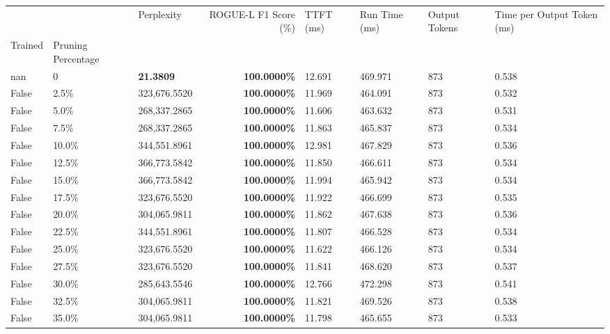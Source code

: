 \begin{table}[H]
{\label{tab:evaluation-pipeline-6-untrained}
\begin{tabular}{lllrllll}
\toprule
 &  & Perplexity & ROGUE-L F1 Score (\%) & TTFT (ms) & Run Time (ms) & Output Tokens & Time per Output Token (ms) \\
Trained & Pruning Percentage &  &  &  &  &  &  \\
\midrule
nan & 0 & \bfseries 21.3809 & \bfseries 100.0000\% & 12.691 & 469.971 & 873 & 0.538 \\
\cline{1-8}
False & 2.5\% & 323,676.5520 & \bfseries \color{red} 100.0000\% & 11.969 & 464.091 & 873 & 0.532 \\
\cline{1-8}
False & 5.0\% & \color{red} 268,337.2865 & \bfseries \color{red} 100.0000\% & 11.606 & 463.632 & 873 & 0.531 \\
\cline{1-8}
False & 7.5\% & \color{red} 268,337.2865 & \bfseries \color{red} 100.0000\% & 11.863 & 465.837 & 873 & 0.534 \\
\cline{1-8}
False & 10.0\% & 344,551.8961 & \bfseries \color{red} 100.0000\% & 12.981 & 467.829 & 873 & 0.536 \\
\cline{1-8}
False & 12.5\% & 366,773.5842 & \bfseries \color{red} 100.0000\% & 11.850 & 466.611 & 873 & 0.534 \\
\cline{1-8}
False & 15.0\% & 366,773.5842 & \bfseries \color{red} 100.0000\% & 11.994 & 465.942 & 873 & 0.534 \\
\cline{1-8}
False & 17.5\% & 323,676.5520 & \bfseries \color{red} 100.0000\% & 11.922 & 466.699 & 873 & 0.535 \\
\cline{1-8}
False & 20.0\% & 304,065.9811 & \bfseries \color{red} 100.0000\% & 11.862 & 467.638 & 873 & 0.536 \\
\cline{1-8}
False & 22.5\% & 344,551.8961 & \bfseries \color{red} 100.0000\% & 11.807 & 466.528 & 873 & 0.534 \\
\cline{1-8}
False & 25.0\% & 323,676.5520 & \bfseries \color{red} 100.0000\% & 11.622 & 466.126 & 873 & 0.534 \\
\cline{1-8}
False & 27.5\% & 323,676.5520 & \bfseries \color{red} 100.0000\% & 11.841 & 468.620 & 873 & 0.537 \\
\cline{1-8}
False & 30.0\% & 285,643.5546 & \bfseries \color{red} 100.0000\% & 12.766 & 472.298 & 873 & 0.541 \\
\cline{1-8}
False & 32.5\% & 304,065.9811 & \bfseries \color{red} 100.0000\% & 11.821 & 469.526 & 873 & 0.538 \\
\cline{1-8}
False & 35.0\% & 304,065.9811 & \bfseries \color{red} 100.0000\% & 11.798 & 465.655 & 873 & 0.533 \\

\end{tabular}}
\end{table}
